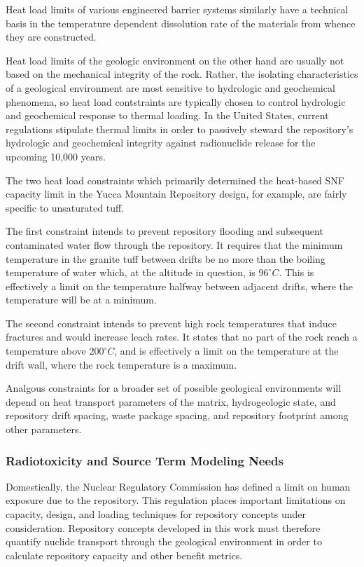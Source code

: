 Heat load limits of various engineered barrier systems similarly have 
a technical basis in the temperature dependent dissolution rate of the 
materials from whence they are constructed.  

Heat load limits of the geologic environment on the other hand are 
usually not based on the mechanical integrity of the rock.  Rather, 
the isolating characteristics of a geological environment are most 
sensitive to hydrologic and geochemical phenomena, so heat load 
contstraints are typically chosen to control hydrologic and 
geochemical response to thermal loading. In the United States, current 
regulations stipulate thermal limits in order to passively steward the 
repository's hydrologic and geochemical integrity against radionuclide  
release for the upcoming 10,000 years.

The two heat load constraints which primarily determined the 
heat-based SNF capacity limit in the Yucca Mountain Repository design, 
for example, are fairly specific to unsaturated tuff. 

The first constraint intends to prevent repository flooding and 
subsequent contaminated water flow through the repository. It requires 
that the minimum temperature in the granite tuff between drifts be no 
more than the boiling temperature of water which, at the altitude in 
question, is $96^{\circ}C$. This is effectively a limit on the 
temperature halfway between adjacent drifts, where the temperature 
will be at a minimum.

The second constraint intends to prevent high rock temperatures that 
induce fractures and would increase leach rates. It states that no 
part of the rock reach a temperature above $200^{\circ}C$, and is 
effectively a limit on the temperature at the drift wall, where the 
rock temperature is a maximum.  

Analgous constraints for a broader set of possible geological 
environments will depend on heat transport parameters of the matrix, 
hydrogeologic state, and repository drift spacing, waste package 
spacing, and repository footprint among other parameters. 

\subsubsection{Radiotoxicity and Source Term Modeling Needs}

Domestically, the Nuclear Regulatory Commission has defined a limit on  
human exposure due to the repository. This regulation places important 
limitations on capacity, design, and loading techniques for repository 
concepts under consideration. Repository concepts developed in this 
work must therefore quantify nuclide transport through the geological 
environment in order to calculate repository capacity and other 
benefit metrics. 

